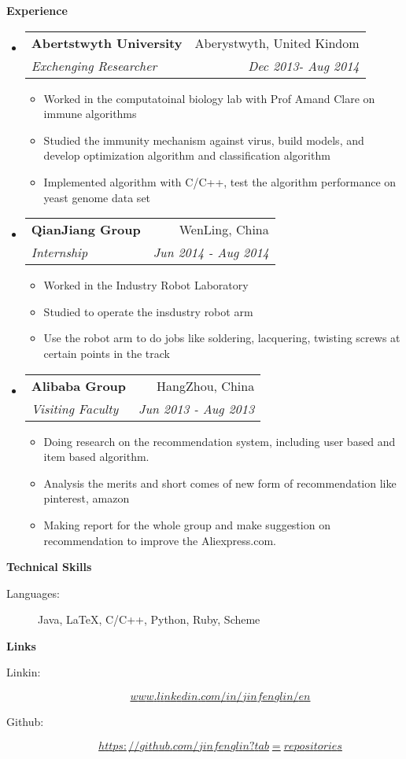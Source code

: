 \documentclass[letterpaper,11pt]{article}
\makeatletter
\newcommand{\resitem}[1]{\item #1 \vspace{-2pt}}
\newcommand{\resheading}[1]{{\large \colorbox{mygrey}{\begin{minipage}{\textwidth}{\textbf{#1 \vphantom{p\^{E}}}}\end{minipage}}}}
\newcommand{\ressubheading}[4]{
\begin{tabular*}{6.5in}{l@{\extracolsep{\fill}}r}
		\textbf{#1} & #2 \\
		\textit{#3} & \textit{#4} \\
\end{tabular*}\vspace{-6pt}}
\makeatother
\begin{document}
\resheading{Experience}
\begin{itemize}
\item
	\ressubheading{Abertstwyth University}{Aberystwyth, United Kindom}{Exchenging Researcher}{Dec 2013- Aug 2014}
	\begin{itemize}
		\resitem{Worked in the computatoinal biology lab with Prof Amand Clare on immune algorithms }
		\resitem{Studied the immunity mechanism against virus, build models, and develop optimization algorithm and classification algorithm}
		\resitem{Implemented algorithm with C/C++, test the algorithm performance on yeast genome data set}
	\end{itemize}
\item
	\ressubheading{QianJiang Group}{WenLing, China}{Internship}{Jun 2014 - Aug 2014}
	\begin{itemize}
		\resitem{Worked in the Industry Robot Laboratory}
		\resitem{Studied to operate the insdustry robot arm }
		\resitem{Use the robot arm  to do jobs like soldering, lacquering, twisting screws at certain points in the track }
	\end{itemize}
\item
	\ressubheading{Alibaba Group}{HangZhou, China}{Visiting Faculty}{Jun 2013 - Aug 2013}
	\begin{itemize}
		\resitem{Doing research on the recommendation system, including user based and item based algorithm.}
		\resitem{Analysis the merits and short comes of new form of recommendation like pinterest, amazon}
		\resitem{Making report for the whole group and make suggestion on recommendation to improve the Aliexpress.com.}
	\end{itemize}

\end{itemize}


\resheading{Technical Skills}

\begin{description}
\item[Languages:]
Java, \LaTeX, C/C++, Python, Ruby, Scheme
\end{description}

\resheading{Links}
\begin{description}
\item[Linkin:] \href{www.linkedin.com/in/jinfenglin/en}{$$www.linkedin.com/in/jinfenglin/en$$ }
\item[Github:] \href{https://github.com/jinfenglin?tab=repositories}{$$https://github.com/jinfenglin?tab=repositories$$}
\end{description}
\end{document}

